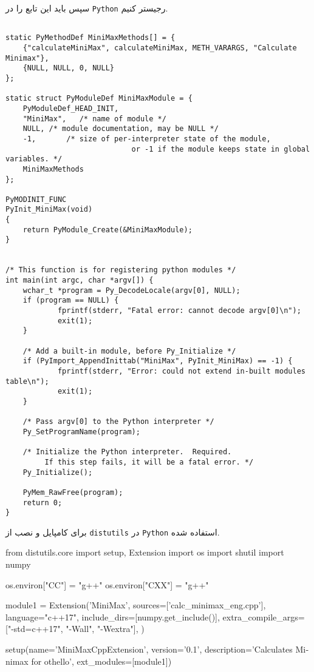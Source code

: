  سپس باید این تابع را در
 \verb;Python;
 رجیستر کنیم.

 \begin{latin}
 \begin{lstlisting}
 
static PyMethodDef MiniMaxMethods[] = {
	{"calculateMiniMax", calculateMiniMax, METH_VARARGS, "Calculate Minimax"},
	{NULL, NULL, 0, NULL}
};

static struct PyModuleDef MiniMaxModule = {
	PyModuleDef_HEAD_INIT,
	"MiniMax",   /* name of module */
	NULL, /* module documentation, may be NULL */
	-1,       /* size of per-interpreter state of the module,
							 or -1 if the module keeps state in global variables. */
	MiniMaxMethods
};

PyMODINIT_FUNC
PyInit_MiniMax(void)
{
	return PyModule_Create(&MiniMaxModule);
}


/* This function is for registering python modules */
int main(int argc, char *argv[]) {
	wchar_t *program = Py_DecodeLocale(argv[0], NULL);
	if (program == NULL) {
			fprintf(stderr, "Fatal error: cannot decode argv[0]\n");
			exit(1);
	}

	/* Add a built-in module, before Py_Initialize */
	if (PyImport_AppendInittab("MiniMax", PyInit_MiniMax) == -1) {
			fprintf(stderr, "Error: could not extend in-built modules table\n");
			exit(1);
	}

	/* Pass argv[0] to the Python interpreter */
	Py_SetProgramName(program);

	/* Initialize the Python interpreter.  Required.
		 If this step fails, it will be a fatal error. */
	Py_Initialize();

	PyMem_RawFree(program);
	return 0;
}
 \end{lstlisting}
 \end{latin}
 
 برای کامپایل و نصب از
 \verb;distutils;
 در
 \verb;Python;
 استفاده شده.


\begin{latin}
\begin{python}
from distutils.core import setup, Extension
import os
import shutil
import numpy

os.environ["CC"] = "g++"
os.environ["CXX"] = "g++"


module1 = Extension('MiniMax',
                    sources=['calc_minimax_eng.cpp'],
                    language="c++17",
                    include_dirs=[numpy.get_include()],
                    extra_compile_args=["-std=c++17", "-Wall", "-Wextra"],
                    )

setup(name='MiniMaxCppExtension',
       version='0.1',
       description='Calculates Minimax for othello',
       ext_modules=[module1])
\end{python}
\end{latin}

